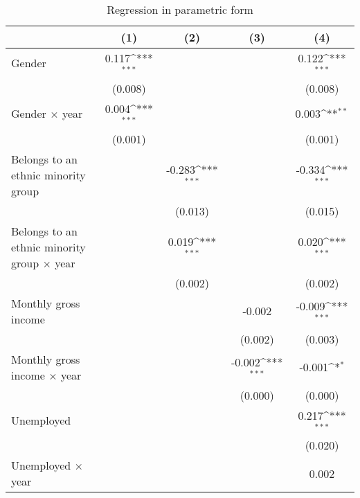 {
\def\sym#1{\ifmmode^{#1}\else\(^{#1}\)\fi}
\begin{longtable}{l*{4}{c}}
\caption{Regression in parametric form\label{tab3}}\\
\toprule\endfirsthead\midrule\endhead\midrule\endfoot\endlastfoot
                &\multicolumn{1}{c}{(1)}         &\multicolumn{1}{c}{(2)}         &\multicolumn{1}{c}{(3)}         &\multicolumn{1}{c}{(4)}         \\
\midrule
Gender          &    0.117\sym{***}&                  &                  &    0.122\sym{***}\\
                &  (0.008)         &                  &                  &  (0.008)         \\
\addlinespace
Gender $\times$ year&    0.004\sym{***}&                  &                  &    0.003\sym{**} \\
                &  (0.001)         &                  &                  &  (0.001)         \\
\addlinespace
Belongs to an ethnic minority group&                  &   -0.283\sym{***}&                  &   -0.334\sym{***}\\
                &                  &  (0.013)         &                  &  (0.015)         \\
\addlinespace
Belongs to an ethnic minority group $\times$ year&                  &    0.019\sym{***}&                  &    0.020\sym{***}\\
                &                  &  (0.002)         &                  &  (0.002)         \\
\addlinespace
Monthly gross income&                  &                  &   -0.002         &   -0.009\sym{***}\\
                &                  &                  &  (0.002)         &  (0.003)         \\
\addlinespace
Monthly gross income $\times$ year&                  &                  &   -0.002\sym{***}&   -0.001\sym{*}  \\
                &                  &                  &  (0.000)         &  (0.000)         \\
\addlinespace
Unemployed      &                  &                  &                  &    0.217\sym{***}\\
                &                  &                  &                  &  (0.020)         \\
\addlinespace
Unemployed $\times$ year&                  &                  &                  &    0.002         \\

\end{longtable}}
